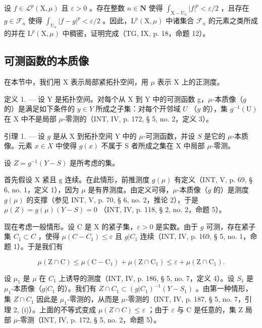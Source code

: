 设 \(f \in \mathcal{L}^p(\mathrm{X},\mu)\) 且 \(\varepsilon > 0\) 。存在整数 \(n \in \mathbf{N}\) 使得 \(\int_{\mathrm{X}-\mathrm{U}_n}|f|^p < \varepsilon / 2\) ，且存在 \(g \in \mathcal{F}_n\) 使得 \(\int_{\overline{\mathrm{U}}_n}|f - g|^p < \varepsilon / 2\) 。因此，\(\mathrm{L}^p(\mathrm{X},\mu)\) 中诸集合 \(\mathcal{F}_n\) 的元素之类所成的并在 \(\mathrm{L}^p(\mathrm{X},\mu)\) 中稠密，证明完成（TG, IX, p. 18，命题 12）。

\subsection{可测函数的本质像}

在本节中，我们用 X 表示局部紧拓扑空间，用 \(\mu\) 表示 X 上的正测度。

定义 1. --- 设 Y 是拓扑空间。对每个从 X 到 Y 中的可测函数 g，\(\mu\)-本质像（\(g\) 的）是满足如下条件的 \(y \in Y\) 所成之子集：对每个开邻域 \(U\) （\(y\) 的），集 \(g^{-1}(\mathrm{U})\) 在 X 中不是局部 \(\mu\)-零测的（INT, IV, p. 172, § 5, no. 2，定义 3）。

引理 1. --- 设 \(g\) 是从 X 到拓扑空间 Y 中的 \(\mu\)-可测函数，并设 \(S\) 是它的 \(\mu\)-本质像。元素 \(x \in X\) 中使得 \(g(x)\) 不属于 S 者所成之集在 X 中局部 \(\mu\)-零测。

设 \(Z = g^{-1}(Y - S)\) 是所考虑的集。

首先假设 X 紧且 g 连续。在此情形，前推测度 \(g(\mu)\) 有定义（INT, V, p. 69, § 6, no. 1，定义 1），因为 \(\mu\) 是有界测度。由定义可得，\(\mu\)-本质像（\(g\) 的）是测度 \(g(\mu)\) 的支撑（参见 INT, V, p. 70, § 6, no. 2，推论 2），于是 \(\mu(Z) = g(\mu)(Y - S) = 0\) （INT, IV, p. 118, § 2, no. 2，命题 5）。

现在考虑一般情形。设 C 是 X 的紧子集，\(\varepsilon > 0\) 是实数。由于 \(g\) 可测，存在紧子集 \(C_1 \subset C\) ，使得 \(\mu(C - C_1) \leqslant \varepsilon\) 且 \(g|C_1\) 连续（INT, IV, p. 169, § 5, no. 1，命题 1）。于是我们有

\[
\mu (\mathrm{Z} \cap \mathrm{C}) \leqslant \mu (\mathrm{C} - \mathrm{C} _ {1}) + \mu (\mathrm{Z} \cap \mathrm{C} _ {1}) \leqslant \varepsilon + \mu (\mathrm{Z} \cap \mathrm{C} _ {1}).
\]

设 \(\mu_{1}\) 是 \(\mu\) 在 \(C_{1}\) 上诱导的测度（INT, IV, p. 186, § 5, no. 7，定义 4）。设 \(S_{1}\) 是 \(\mu_{1}\)-本质像（\(g|C_{1}\) 的）。我们有 \(Z\cap C_{1}\subset(g|C_{1})^{-1}(Y-S_{1})\) 。由第一种情形，集 \(Z\cap C_{1}\) 因此是 \(\mu_{1}\)-零测的，从而是 \(\mu\)-零测的（INT, IV, p. 187, § 5, no. 7，引理 2, (i)）。上面的不等式变成 \(\mu(Z\cap C)\leqslant\varepsilon\) ；由于 \(\varepsilon\) 与 C 是任意的，集 Z 局部 \(\mu\)-零测（INT, IV, p. 172, § 5, no. 2，命题 5）。

